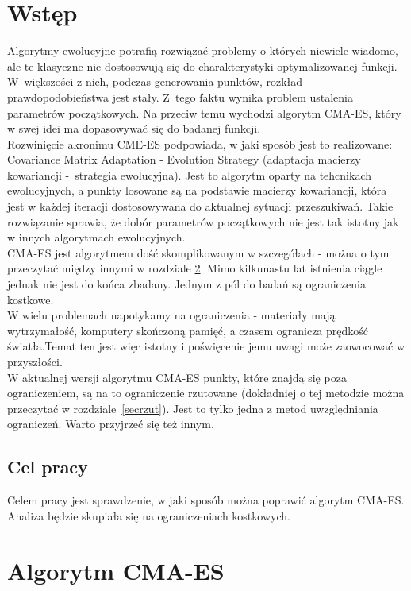 \documentclass{mini}
\begin{document}
\section{Wstęp}
Algorytmy ewolucyjne potrafią rozwiązać problemy o których niewiele wiadomo, ale te klasyczne nie dostosowują się do charakterystyki optymalizowanej funkcji. W~większości z nich, podczas generowania punktów, rozkład prawdopodobieństwa jest stały. Z~tego faktu wynika problem ustalenia parametrów początkowych. Na przeciw temu wychodzi algorytm CMA-ES, który w swej idei ma dopasowywać się do badanej funkcji.\\
Rozwinięcie akronimu CME-ES podpowiada, w jaki sposób jest to realizowane: Covariance Matrix Adaptation - Evolution Strategy (adaptacja macierzy kowariancji -~strategia ewolucyjna). Jest to algorytm oparty na tehcnikach ewolucyjnych, a punkty losowane są na podstawie macierzy kowariancji, która jest w każdej iteracji dostosowywana do aktualnej sytuacji przeszukiwań. Takie rozwiązanie sprawia, że dobór parametrów początkowych nie jest tak istotny jak w innych algorytmach ewolucyjnych.\\
CMA-ES jest algorytmem dość skomplikowanym w szczegółach - można o tym przeczytać między innymi w rozdziale \ref{secalgcmaes}. Mimo kilkunastu lat istnienia ciągle jednak nie jest do końca zbadany. Jednym z pól do badań są ograniczenia kostkowe.\\
W wielu problemach napotykamy na ograniczenia - materiały mają wytrzymałość, komputery skończoną pamięć, a czasem ogranicza prędkość światła.Temat ten jest więc istotny i poświęcenie jemu uwagi może zaowocować w przyszłości.\\
W aktualnej wersji algorytmu CMA-ES punkty, które znajdą się poza ograniczeniem, są na to ograniczenie rzutowane (dokładniej o tej metodzie można przeczytać w rozdziale~\ref{secrzut}). Jest to tylko jedna z metod uwzględniania ograniczeń. Warto przyjrzeć się też innym.

\subsection{Cel pracy}
Celem pracy jest sprawdzenie, w jaki sposób można poprawić algorytm CMA-ES. Analiza będzie skupiała się na ograniczeniach kostkowych.

\pagebreak

\section{Algorytm CMA-ES}
\label{secalgcmaes}
\end{document}
